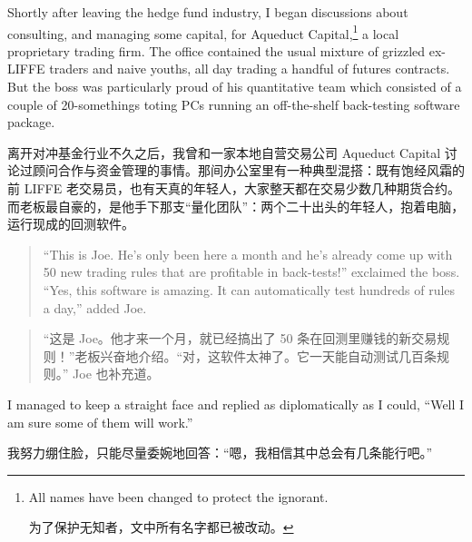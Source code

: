 

\begin{englishblock} Shortly after leaving the hedge fund industry, I began discussions about consulting, and managing some capital, for Aqueduct Capital,\footnote{All names have been changed to protect the ignorant. \par 为了保护无知者，文中所有名字都已被改动。} a local proprietary trading firm. The office contained the usual mixture of grizzled ex-LIFFE traders and naive youths, all day trading a handful of futures contracts. But the boss was particularly proud of his quantitative team which consisted of a couple of 20-somethings toting PCs running an off-the-shelf back-testing software package. \end{englishblock}

\begin{chineseblock}离开对冲基金行业不久之后，我曾和一家本地自营交易公司 Aqueduct Capital 讨论过顾问合作与资金管理的事情。那间办公室里有一种典型混搭：既有饱经风霜的前 LIFFE 老交易员，也有天真的年轻人，大家整天都在交易少数几种期货合约。而老板最自豪的，是他手下那支“量化团队”：两个二十出头的年轻人，抱着电脑，运行现成的回测软件。\end{chineseblock}

\begin{quote}
\begingroup\color{\englishbodycolorname} ``This is Joe. He's only been here a month and he's already come up with 50 new trading rules that are profitable in back-tests!'' exclaimed the boss. ``Yes, this software is amazing. It can automatically test hundreds of rules a day,'' added Joe. \endgroup
\end{quote}

\begin{quote}
\begingroup\color{\chinesebodycolorname}“这是 Joe。他才来一个月，就已经搞出了 50 条在回测里赚钱的新交易规则！”老板兴奋地介绍。“对，这软件太神了。它一天能自动测试几百条规则。” Joe 也补充道。\endgroup
\end{quote}

\bipairgap

\begin{englishblock} I managed to keep a straight face and replied as diplomatically as I could, ``Well I am sure some of them will work.'' \end{englishblock}

\begin{chineseblock}我努力绷住脸，只能尽量委婉地回答：“嗯，我相信其中总会有几条能行吧。”\end{chineseblock}

